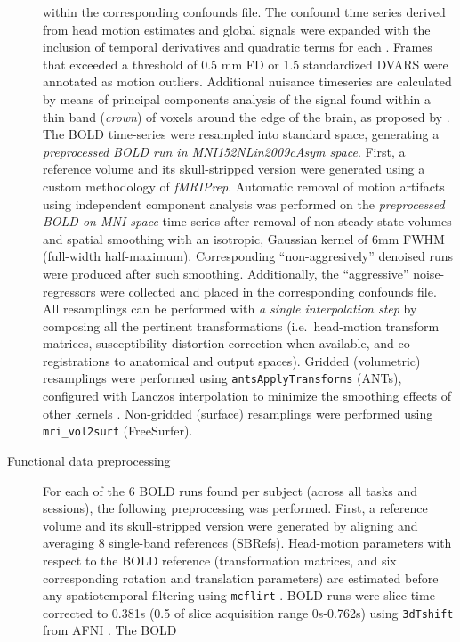\documentclass[
]{article}
\begin{document}
\begin{description}
within the corresponding confounds file. The confound time series
derived from head motion estimates and global signals were expanded with
the inclusion of temporal derivatives and quadratic terms for each
\citep{confounds_satterthwaite_2013}. Frames that exceeded a threshold
of 0.5 mm FD or 1.5 standardized DVARS were annotated as motion
outliers. Additional nuisance timeseries are calculated by means of
principal components analysis of the signal found within a thin band
(\emph{crown}) of voxels around the edge of the brain, as proposed by
\citep{patriat_improved_2017}. The BOLD time-series were resampled into
standard space, generating a \emph{preprocessed BOLD run in
MNI152NLin2009cAsym space}. First, a reference volume and its
skull-stripped version were generated using a custom methodology of
\emph{fMRIPrep}. Automatic removal of motion artifacts using independent
component analysis \citep[ICA-AROMA,][]{aroma} was performed on the
\emph{preprocessed BOLD on MNI space} time-series after removal of
non-steady state volumes and spatial smoothing with an isotropic,
Gaussian kernel of 6mm FWHM (full-width half-maximum). Corresponding
``non-aggresively'' denoised runs were produced after such smoothing.
Additionally, the ``aggressive'' noise-regressors were collected and
placed in the corresponding confounds file. All resamplings can be
performed with \emph{a single interpolation step} by composing all the
pertinent transformations (i.e.~head-motion transform matrices,
susceptibility distortion correction when available, and
co-registrations to anatomical and output spaces). Gridded (volumetric)
resamplings were performed using \texttt{antsApplyTransforms} (ANTs),
configured with Lanczos interpolation to minimize the smoothing effects
of other kernels \citep{lanczos}. Non-gridded (surface) resamplings were
performed using \texttt{mri\_vol2surf} (FreeSurfer).
\item[Functional data preprocessing]
For each of the 6 BOLD runs found per subject (across all tasks and
sessions), the following preprocessing was performed. First, a reference
volume and its skull-stripped version were generated by aligning and
averaging 8 single-band references (SBRefs). Head-motion parameters with
respect to the BOLD reference (transformation matrices, and six
corresponding rotation and translation parameters) are estimated before
any spatiotemporal filtering using \texttt{mcflirt} \citep[FSL
6.0.5.1:57b01774,][]{mcflirt}. BOLD runs were slice-time corrected to
0.381s (0.5 of slice acquisition range 0s-0.762s) using
\texttt{3dTshift} from AFNI \citep[RRID:SCR\_005927]{afni}. The BOLD

\end{description}
\end{document}
